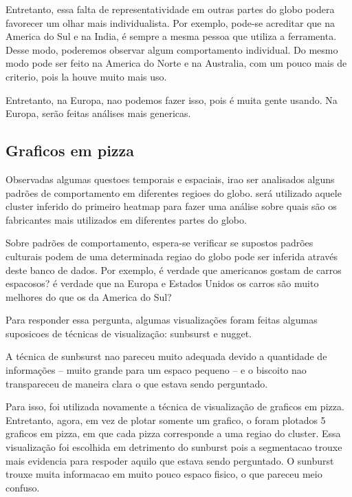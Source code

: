 \documentclass[10pt, conference]{IEEEtran}
\begin{document}
Entretanto, essa falta de representatividade em outras partes do globo podera favorecer um
olhar mais individualista. Por exemplo, pode-se acreditar que na America do Sul e na India,
é sempre a mesma pessoa que utiliza a ferramenta. Desse modo, poderemos observar algum
comportamento individual. Do mesmo modo pode ser feito na America do Norte e na Australia,
com um pouco mais de criterio, pois la houve muito mais uso.

Entretanto, na Europa, nao podemos fazer isso, pois é muita gente usando. Na Europa, serão
feitas análises mais genericas.




\subsection{Graficos em pizza}

Observadas algumas questoes temporais e espaciais, irao ser analisados alguns padrões de comportamento
em diferentes regioes do globo. será utilizado aquele cluster inferido do primeiro heatmap para
fazer uma análise sobre quais são os fabricantes mais utilizados em diferentes partes do globo.

Sobre padrões de comportamento, espera-se verificar se supostos padrões culturais podem de uma determinada
regiao do globo pode ser inferida através deste banco de dados. Por exemplo, é verdade que americanos
gostam de carros espacosos? é verdade que na Europa e Estados Unidos os carros são muito melhores
do que os da America do Sul?

Para responder essa pergunta, algumas visualizações foram feitas algumas suposicoes de técnicas
de visualização: sunbsurst e nugget. 

A técnica de sunbsurst nao pareceu muito adequada devido a quantidade de informações -- muito grande para
um espaco pequeno -- e o biscoito nao transpareceu de maneira clara o que estava sendo perguntado.

Para isso, foi utilizada novamente a técnica de visualização de graficos em pizza. Entretanto, agora,
em vez de plotar somente um grafico, o foram plotados 5 graficos em pizza, em que cada pizza corresponde
a uma regiao do cluster. Essa visualização foi escolhida em detrimento do sunburst pois a segmentacao
trouxe mais evidencia para respoder aquilo que estava sendo perguntado. O sunburst trouxe muita informacao
em muito pouco espaco fisico, o que pareceu meio confuso.
\end{document}
